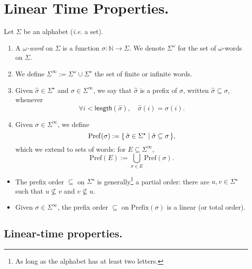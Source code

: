 \documentclass[./main]{subfiles}
\begin{document}
  \chapter{Linear Time Properties.}

  \begin{en-defn}
    Let $\Sigma$ be an alphabet (\textit{i.e.} a set).
    \begin{enumerate}
      \item A \textit{$\omega$-word} on $\Sigma$ is a function $\sigma : \mathds{N} \to \Sigma$.
        We denote $\Sigma^\omega$ for the set of $\omega$-words on $\Sigma$.
      \item We define $\Sigma^\infty := \Sigma^\omega \cup \Sigma^\star$ the set of finite or infinite words.
      \item Given $\hat{\sigma} \in \Sigma^\star$ and $\sigma \in \Sigma^\infty$, we say that $\hat{\sigma}$ is a prefix of $\sigma$, written $\hat{\sigma} \subseteq \sigma$, whenever 
        \[
        \forall i < \mathsf{length}(\hat{\sigma}), \quad \hat{\sigma}(i) = \sigma(i)
        .\]
      \item Given $\sigma \in \Sigma^\infty$, we define \[
        \mathrm{Pref}(\sigma) := \mleft\{\,\hat{\sigma} \in \Sigma^\star \;\middle|\; \hat{\sigma} \subseteq \sigma\,\mright\} 
        ,\]
        which we extend to sets of words: for $E \subseteq \Sigma^\infty$,
        \[
          \mathrm{Pref}(E) := \bigcup_{\sigma \in E} \mathrm{Pref}(\sigma)
        .\]
    \end{enumerate}
  \end{en-defn}

  \begin{en-rmk}
    \begin{itemize}
      \item The prefix order $\subseteq$ on $\Sigma^\star$ is generally\footnote{As long as the alphabet has at least two letters.} a partial order: there are $u,v \in \Sigma^\star$ such that $u \not\subseteq v$ and $v \not\subseteq u$.
      \item Given $\sigma \in \Sigma^\infty$, the prefix order $\subseteq$ on $\mathrm{Prefix}(\sigma)$ is a linear (or total order).
    \end{itemize}
  \end{en-rmk}

  \section{Linear-time properties.}
\end{document}
